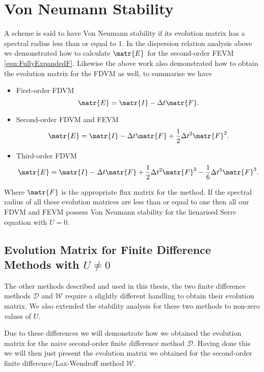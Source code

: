 \section{Von Neumann Stability}
A scheme is said to have Von Neumann stability if its evolution matrix has a spectral radius less than or equal to $1$. In the dispersion relation analysis above we demonstrated how to calculate $\matr{E}$ for the second-order FEVM \eqref{eqn:FullyExpandedF}. Likewise the above work also demonstrated how to obtain the evolution matrix for the FDVM as well, to summarise we have 
\begin{itemize}
	\item First-order FDVM
	\[\matr{E} = \matr{I} - \Delta t \matr{F}. \]
	\item Second-order FDVM and FEVM
	\[\matr{E} = \matr{I} - \Delta t \matr{F} + \frac{1}{2} \Delta t^2 \matr{F}^2.\]
	\item Third-order FDVM
	\[\matr{E} = \matr{I} - \Delta t \matr{F} + \frac{1}{2} \Delta t^2 \matr{F}^2 - \frac{1}{6} \Delta t^3 \matr{F}^3.\]
\end{itemize}
Where $\matr{F}$ is the appropriate flux matrix for the method. If the spectral radius of all these evolution matrices are less than or equal to one then all our FDVM and FEVM possess Von Neumann stability for the lienarised Serre equation with $U = 0$.

\subsection{Evolution Matrix for Finite Difference Methods with $U \neq 0$}
The other methods described and used in this thesis, the two finite difference methods $\mathcal{D}$ and $\mathcal{W}$ require a slightly different handling to obtain their evolution matrix. We also extended the stability analysis for these two methods to non-zero values of $U$.

Due to these differences we will demonstrate how we obtained the evolution matrix for the naive second-order finite difference method $\mathcal{D}$. Having done this we will then just present the evolution matrix we obtained for the second-order finite difference/Lax-Wendroff method $\mathcal{W}$.


